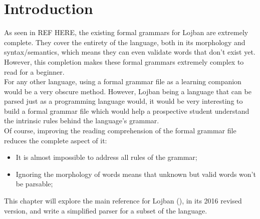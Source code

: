 \section{Introduction}

As seen in REF HERE, the existing formal grammars for Lojban are extremely complete. They cover the entirety of the language, both in its morphology and syntax/semantics, which means they can even validate words that don't exist yet. However, this completion makes these formal grammars extremely complex to read for a beginner. \\

For any other language, using a formal grammar file as a learning companion would be a very obscure method. However, Lojban being a language that can be parsed just as a programming language would, it would be very interesting to build a formal grammar file which would help a prospective student understand the intrinsic rules behind the language's grammar. \\

Of course, improving the reading comprehension of the formal grammar file reduces the complete aspect of it:

\begin{itemize}
  \item It is almost impossible to address all rules of the grammar;
  \item Ignoring the morphology of words means that unknown but valid words won't be parsable;
\end{itemize}

This chapter will explore the main reference for Lojban (\cite{cowan1997complete}), in its 2016 revised version, and write a simplified parser for a subset of the language.